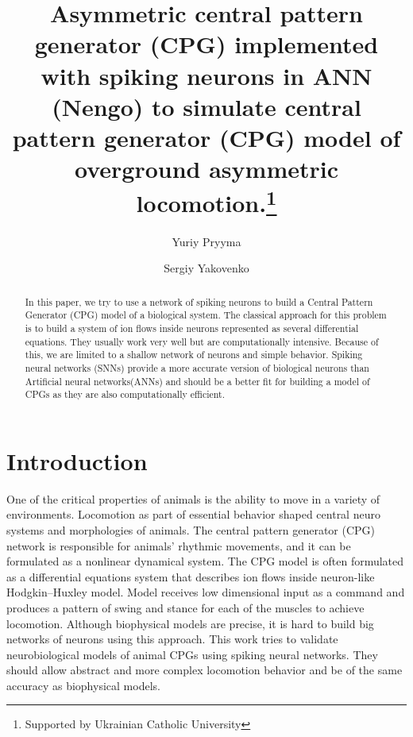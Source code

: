 \documentclass[runningheads]{llncs}
\begin{document}
%
\title{Asymmetric central pattern generator (CPG) implemented with spiking neurons in ANN (Nengo) to simulate central pattern generator (CPG) model of overground asymmetric locomotion.\thanks{Supported by Ukrainian Catholic University}}
%
%
\author{Yuriy Pryyma\and
Sergiy Yakovenko}
%
%
%
\maketitle              %
%
\begin{abstract}
In this paper, we try to use a network of spiking neurons to build a Central Pattern Generator (CPG) model of a biological system. The classical approach for this problem is to build a system of ion flows inside neurons represented as several differential equations. They usually work very well but are computationally intensive. Because of this, we are limited to a shallow network of neurons and simple behavior. Spiking neural networks (SNNs) provide a more accurate version of biological neurons than Artificial neural networks(ANNs) and should be a better fit for building a model of CPGs as they are also computationally efficient.

\end{abstract}
%
%
%

\section{Introduction}
One of the critical properties of animals is the ability to move in a variety of environments. Locomotion as part of essential behavior shaped central neuro systems and morphologies of animals.
The central pattern generator (CPG) network is responsible for animals' rhythmic movements, and it can be formulated as a nonlinear dynamical system. The CPG model is often formulated as a differential equations system that describes ion flows inside neuron-like Hodgkin–Huxley model. Model receives low dimensional input as a command and produces a pattern of swing and stance for each of the muscles to achieve locomotion. Although biophysical models are precise, it is hard to build big networks of neurons using this approach. This work tries to validate neurobiological models of animal CPGs using spiking neural networks. They should allow abstract and more complex locomotion behavior and be of the same accuracy as biophysical models.
\end{document}

